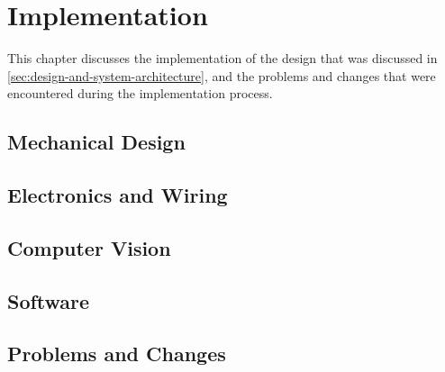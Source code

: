 \section{Implementation}
\label{sec:implementation}

This chapter discusses the implementation of the design that was discussed in \autoref{sec:design-and-system-architecture}, and the problems and changes that were encountered during the implementation process.

\subsection{Mechanical Design}
\label{sec:implementation-mechanical-design}


\subsection{Electronics and Wiring}
\label{sec:electronics}


\subsection{Computer Vision}
\label{sec:computer-vision}
  

\subsection{Software}
\label{sec:software}


\subsection{Problems and Changes}

\label{sec:implementation-problems-and-changes}